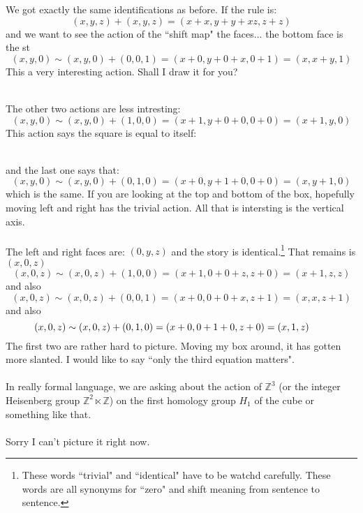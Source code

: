 \documentclass[12pt]{article}
\begin{document}
\noindent We got exactly the same identifications as before.  If the rule is:
$$ (x,y,z) + (x,y,z) = (x+x, y+y+xz , z + z) $$
and we want to see the action of the ``shift map" the faces... the bottom face is the st
$$ (x,y,0) \sim (x,y,0) + (0,0,1) = (x+0, y+0+x, 0+1) = (x,x+y,1) $$
This a very interesting action.  Shall I draw it for you? \\
 \\
The other two actions are less intresting:
$$ (x,y,0) \sim (x,y,0) + (1,0,0) = (x+1, y+0+0, 0+0) = (x+1,y,0) $$
This action says the square is equal to itself:\\
 \\
and the last one says that:
$$ (x,y,0) \sim (x,y,0) + (0,1,0) = (x+0, y+1+0, 0+0) = (x,y+1,0) $$
which is the same.  If you are looking at the top and bottom of the box, hopefully moving left and right has the trivial action. All that is intersting is the vertical axis. \\ \\
The left and right faces are: $(0,y,z)$ and the story is identical.\footnote{These words ``trivial" and ``identical" have to be watchd carefully.  These words are all synonyms for ``zero" and shift meaning from sentence to sentence.  }  That remains is $(x,0,z)$ 
$$ (x,0,z) \sim (x,0,z) + (1,0,0) = (x+1, 0 + 0 + z, z + 0)= (x+1,z,z) $$
and also 
$$ (x,0,z) \sim (x,0,z) + (0,0,1) = (x+0, 0 + 0 + x, z + 1)= (x,x,z+1) $$
and also
$$ (x,0,z) \sim (x,0,z) + (0,1,0) = (x+0, 0+1+0, z + 0)= (x,1,z) \hspace{0.27in} $$
The first two are rather hard to picture.  Moving my box around, it has gotten more slanted.  I would like to say ``only the third equation matters".   \\ \\
In really formal language, we are asking about the action of $\mathbb{Z}^3$ (or the integer Heisenberg group $\mathbb{Z}^2 \ltimes \mathbb{Z} $) on the first homology group $H_1$ of the cube or something like that. \\ \\
Sorry I can't picture it right now.
\newpage
\end{document}
